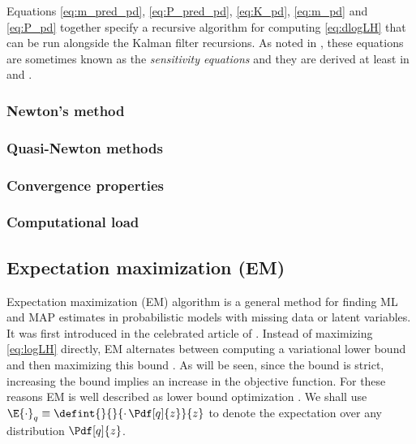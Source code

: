 Equations \eqref{eq:m_pred_pd}, \eqref{eq:P_pred_pd}, \eqref{eq:K_pd}, \eqref{eq:m_pd} and \eqref{eq:P_pd} together specify
a recursive algorithm for computing \eqref{eq:dlogLH} that can be run alongside the Kalman filter recursions.
As noted in \textcite{Cappe2005}, these equations are sometimes known as the \emph{sensitivity equations}
and they are derived at least in \textcite{Gupta1974} and \textcite{Mbalawataa}.

\subsubsection{Newton's method}

\subsubsection{Quasi-Newton methods}

\subsubsection{Convergence properties}

\subsubsection{Computational load}

\subsection{Expectation maximization (EM)}%

Expectation maximization (EM) algorithm is a general
method for finding ML and MAP estimates in probabilistic models with missing data or
latent variables. It was first introduced in
the celebrated article of \textcite{Dempster1977}. Instead of maximizing
\eqref{eq:logLH} directly, EM alternates between computing a variational lower bound and then maximizing this bound
\parencite{Bishop2006,barber2012bayesian}. As will be seen, since the bound is strict, increasing the bound implies
an increase in the objective function. For these reasons EM is well described as lower bound optimization \parencite{Minka1998}.
We shall use $\E{\cdot}_{q}\equiv\defint{}{}{\cdot\,\Pdf[q]{z}}{z}$ to denote the expectation
over any distribution $\Pdf[q]{z}$.

